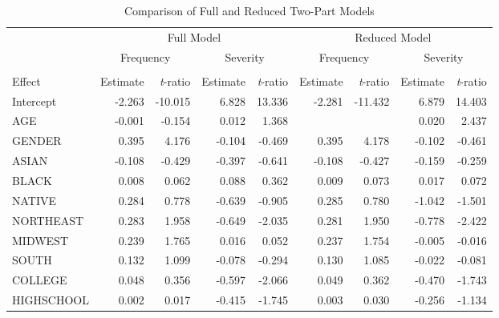 \begin{table}[h]
 \caption{\label{T16:16.3} Comparison of Full and
Reduced Two-Part Models}
\begin{tabular}{lrrrr|rrrr}
\hline
& \multicolumn{4}{c}{Full Model} & \multicolumn{4}{c}{Reduced Model} \\
& \multicolumn{2}{c}{Frequency} & \multicolumn{2}{c}{Severity} &
\multicolumn{2}{c}{Frequency} & \multicolumn{2}{c}{Severity} \\
\cline{2-9} %
  \\
\multicolumn{1}{l}{Effect} & \multicolumn{1}{r}{Estimate} &
\textit{t}-ratio & Estimate & \textit{t}-ratio & Estimate &
\textit{t}-ratio & Estimate & \textit{t}-ratio \\ \hline
 Intercept &     -2.263 &    -10.015 &      6.828 &     13.336 &     -2.281 &    -11.432 &      6.879 &     14.403 \\
       AGE &     -0.001 &     -0.154 &      0.012 &      1.368 &            &            &      0.020 &      2.437 \\
    GENDER &      0.395 &      4.176 &     -0.104 &     -0.469 &      0.395 &      4.178 &     -0.102 &     -0.461 \\
     ASIAN &     -0.108 &     -0.429 &     -0.397 &     -0.641 &     -0.108 &     -0.427 &     -0.159 &     -0.259 \\
     BLACK &      0.008 &      0.062 &      0.088 &      0.362 &      0.009 &      0.073 &      0.017 &      0.072 \\
    NATIVE &      0.284 &      0.778 &     -0.639 &     -0.905 &      0.285 &      0.780 &     -1.042 &     -1.501 \\
 NORTHEAST &      0.283 &      1.958 &     -0.649 &     -2.035 &      0.281 &      1.950 &     -0.778 &     -2.422 \\
   MIDWEST &      0.239 &      1.765 &      0.016 &      0.052 &      0.237 &      1.754 &     -0.005 &     -0.016 \\
     SOUTH &      0.132 &      1.099 &     -0.078 &     -0.294 &      0.130 &      1.085 &     -0.022 &     -0.081 \\
     \hline
   COLLEGE &      0.048 &      0.356 &     -0.597 &     -2.066 &      0.049 &      0.362 &     -0.470 &     -1.743 \\
HIGHSCHOOL &      0.002 &      0.017 &     -0.415 &     -1.745 &      0.003 &      0.030 &     -0.256 &     -1.134 \\

\end{tabular}
\end{table}
